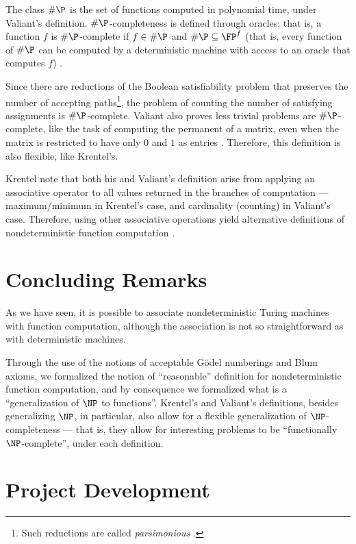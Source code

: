 \documentclass[12pt]{article}
\theoremstyle{definition}
\begin{document}
The class $\#\P$ is the set of functions computed in polynomial time,
under Valiant's definition.
$\#\P$-completeness is defined through oracles;
that is, a function $f$ is $\#\P$-complete if $f \in \#\P$
and $\#\P \subseteq \FP^f$
(that is, every function of $\#\P$ can be computed by a deterministic machine
with access to an oracle that computes $f$)
\cite[p.~191]{Valiant1979}.

Since there are reductions of the Boolean satisfiability problem
that preserves the number of accepting paths\footnote{
    Such reductions are called \emph{parsimonious} \cite[p~346]{AroraBarak2009}.
},
the problem of counting the number of satisfying assignments is $\#\P$-complete.
Valiant also proves less trivial problems are $\#\P$-complete,
like the task of computing the permanent of a matrix,
even when the matrix is restricted to have only $0$ and $1$ as entries
\cite[p.~194]{Valiant1979}.
Therefore,
this definition is also flexible, like Krentel's.

Krentel note that both his and Valiant's definition
arise from applying an associative operator
to all values returned in the branches of computation
--- maximum/minimum in Krentel's case,
and cardinality (counting) in Valiant's case.
Therefore, using other associative operations yield alternative definitions
of nondeterministic function computation \cite[p.~493]{Krentel1988}.

\section{Concluding Remarks}

As we have seen,
it is possible to associate nondeterministic Turing machines
with function computation,
although the association is not so straightforward as with deterministic machines.

Through the use of the notions of acceptable Gödel numberings
and Blum axioms,
we formalized the notion of ``reasonable'' definition
for nondeterministic function computation,
and by consequence we formalized what is a ``generalization of $\NP$ to functions''.
Krentel's and Valiant's definitions,
besides generalizing $\NP$, in particular,
also allow for a flexible generalization of $\NP$-completeness
--- that is, they allow for interesting problems to be ``functionally $\NP$-complete'',
under each definition.

\section{Project Development}
\end{document}
